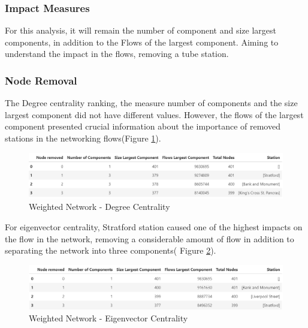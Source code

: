\documentclass[10pt]{report}
\numberwithin{figure}{section}
\numberwithin{table}{section}
\begin{document}
\subsubsection{Impact Measures} 

For this analysis, it will remain the number of component and size largest components, in addition to the Flows of the largest component. Aiming to understand the impact in the flows, removing a tube station. 

\newpage 

\subsubsection{Node Removal} 

The Degree centrality ranking, the measure number of components and the size largest component did not have different values. However, the flows of the largest component presented crucial information about the importance of removed stations in the networking flows(Figure \ref{fig:Table_Flows_degree}). 

    \begin{figure}[htp]
        \centering
        \includegraphics[width=14cm]{Image/Table_Flows_degree.png}
        \caption{Weighted Network - Degree Centrality}
        \label{fig:Table_Flows_degree}
    \end{figure}

For eigenvector centrality, Stratford station caused one of the highest impacts on the flow in the network, removing a considerable amount of flow in addition to separating the network into three components( Figure \ref{fig:Table_Flows_eigenvector}).

    \begin{figure}[htp]
        \centering
        \includegraphics[width=14cm]{Image/Table_Flows_eigenvector.png}
        \caption{Weighted Network - Eigenvector Centrality}
        \label{fig:Table_Flows_eigenvector}
    \end{figure}
\end{document}
